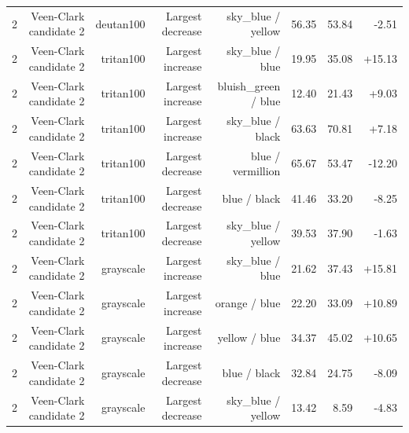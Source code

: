 \begin{tabular}{lrrrrrrr}
2 & Veen-Clark candidate 2 & deutan100 & Largest decrease & sky\_blue / yellow & 56.35 & 53.84 & -2.51 \\
2 & Veen-Clark candidate 2 & tritan100 & Largest increase & sky\_blue / blue & 19.95 & 35.08 & +15.13 \\
2 & Veen-Clark candidate 2 & tritan100 & Largest increase & bluish\_green / blue & 12.40 & 21.43 & +9.03 \\
2 & Veen-Clark candidate 2 & tritan100 & Largest increase & sky\_blue / black & 63.63 & 70.81 & +7.18 \\
2 & Veen-Clark candidate 2 & tritan100 & Largest decrease & blue / vermillion & 65.67 & 53.47 & -12.20 \\
2 & Veen-Clark candidate 2 & tritan100 & Largest decrease & blue / black & 41.46 & 33.20 & -8.25 \\
2 & Veen-Clark candidate 2 & tritan100 & Largest decrease & sky\_blue / yellow & 39.53 & 37.90 & -1.63 \\
2 & Veen-Clark candidate 2 & grayscale & Largest increase & sky\_blue / blue & 21.62 & 37.43 & +15.81 \\
2 & Veen-Clark candidate 2 & grayscale & Largest increase & orange / blue & 22.20 & 33.09 & +10.89 \\
2 & Veen-Clark candidate 2 & grayscale & Largest increase & yellow / blue & 34.37 & 45.02 & +10.65 \\
2 & Veen-Clark candidate 2 & grayscale & Largest decrease & blue / black & 32.84 & 24.75 & -8.09 \\
2 & Veen-Clark candidate 2 & grayscale & Largest decrease & sky\_blue / yellow & 13.42 & 8.59 & -4.83 \\
\bottomrule
\end{tabular}
